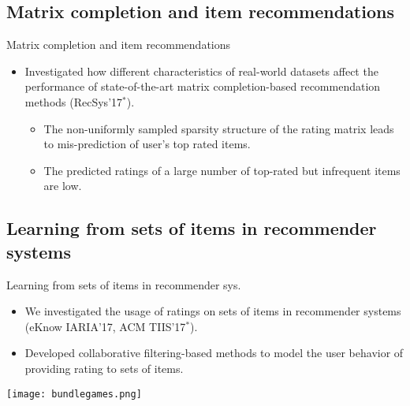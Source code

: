 \documentclass[t,xcolor={dvipsnames,usenames}]{beamer}
\begin{document}
\subsection{Matrix completion and item recommendations}
\begin{frame}{Matrix completion and item recommendations}
  \begin{itemize}
    \item Investigated how different characteristics of real-world datasets affect the performance of state-of-the-art matrix
      completion-based recommendation methods (RecSys'17$^*$).
      \begin{itemize}
        \item The non-uniformly sampled sparsity structure of the rating matrix
          leads to mis-prediction of user's top rated items.
        \item The predicted ratings of a large number of top-rated but
          infrequent items are low.
      \end{itemize}
  \end{itemize}
\end{frame}

\subsection{Learning from sets of items in recommender systems}
\begin{frame}{Learning from sets of items in recommender sys.} 
    \begin{itemize}
      \item We investigated the usage of ratings on sets of items in recommender
        systems (eKnow IARIA'17, ACM TIIS'17$^{*}$).
      \item Developed collaborative filtering-based methods to model the user
        behavior of providing rating to sets of items.
    \end{itemize}
    \begin{center}
      \texttt{[image: bundlegames.png]}
    \end{center}
\end{frame}

\end{document}
